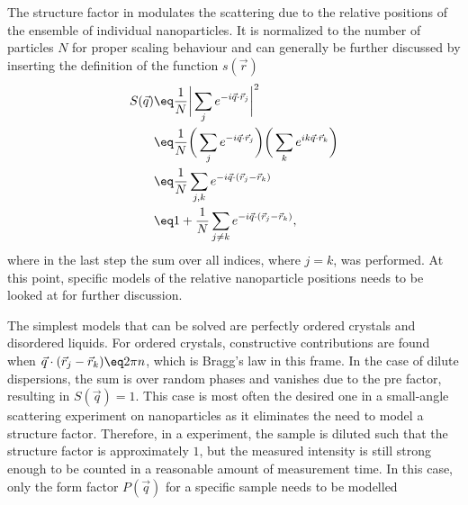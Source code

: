 \documentclass[\main/dresen_thesis.tex]{subfiles}
\begin{document}
    The structure factor in  modulates the scattering due to the relative positions of the ensemble of individual nanoparticles.
    It is normalized to the number of particles $N$ for proper scaling behaviour and can generally be further discussed by inserting the definition of the function $s(\vec{r})$
    \begin{align}
      S(\vec{q}) &\eq \frac{1}{N} \bigg| \sum_j  e^{-i\vec{q} \cdot \vec{r}_j} \bigg|^2\\
      &\eq \frac{1}{N}  \bigg( \sum_j  e^{-i\vec{q} \cdot \vec{r}_j} \bigg) \bigg( \sum_k  e^{i k\vec{q} \cdot \vec{r}_k} \bigg)\\
      &\eq \frac{1}{N}  \sum_{j, k}  e^{-i\vec{q} \cdot (\vec{r}_j - \vec{r}_k) }\\
      &\eq 1 + \frac{1}{N}  \sum_{j \neq k}  e^{-i\vec{q} \cdot (\vec{r}_j - \vec{r}_k)},\label{eq:theoreticalBackground:scattering:scatteringTheory:structureFactor}
    \end{align}
    where in the last step the sum over all indices, where $j=k$, was performed.
    At this point, specific models of the relative nanoparticle positions needs to be looked at for further discussion.

    The simplest models that can be solved are perfectly ordered crystals and disordered liquids.
    For ordered crystals, constructive contributions are found when $\vec{q} \cdot (\vec{r}_j - \vec{r}_k) \eq 2 \pi n$, which is Bragg's law in this frame.
    In the case of dilute dispersions, the sum is over random phases and vanishes due to the pre factor, resulting in $S(\vec{q}) = 1$.
    This case is most often the desired one in a small-angle scattering experiment on nanoparticles as it eliminates the need to model a structure factor.
    Therefore, in a experiment, the sample is diluted such that the structure factor is approximately $1$, but the measured intensity is still strong enough to be counted in a reasonable amount of measurement time.
    In this case, only the form factor $P(\vec{q})$ for a specific sample needs to be modelled
\end{document}
